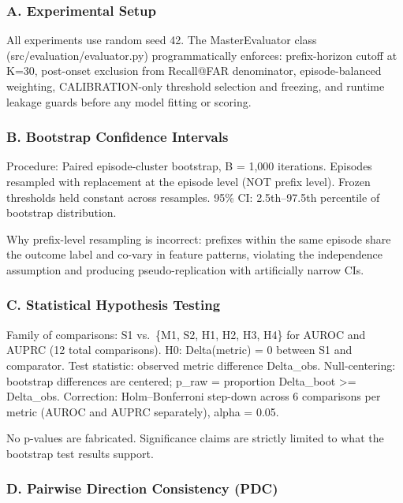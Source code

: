 \documentclass[
]{article}
\begin{document}
\subsubsection{A. Experimental Setup}\label{a.-experimental-setup}

All experiments use random seed 42. The MasterEvaluator class
(src/evaluation/evaluator.py) programmatically enforces: prefix-horizon
cutoff at K=30, post-onset exclusion from Recall@FAR denominator,
episode-balanced weighting, CALIBRATION-only threshold selection and
freezing, and runtime leakage guards before any model fitting or
scoring.

\subsubsection{B. Bootstrap Confidence
Intervals}\label{b.-bootstrap-confidence-intervals}

Procedure: Paired episode-cluster bootstrap, B = 1,000 iterations.
Episodes resampled with replacement at the episode level (NOT prefix
level). Frozen thresholds held constant across resamples. 95\% CI:
2.5th--97.5th percentile of bootstrap distribution.

Why prefix-level resampling is incorrect: prefixes within the same
episode share the outcome label and co-vary in feature patterns,
violating the independence assumption and producing pseudo-replication
with artificially narrow CIs.

\subsubsection{C. Statistical Hypothesis
Testing}\label{c.-statistical-hypothesis-testing}

Family of comparisons: S1 vs.~\{M1, S2, H1, H2, H3, H4\} for AUROC and
AUPRC (12 total comparisons). H0: Delta(metric) = 0 between S1 and
comparator. Test statistic: observed metric difference Delta\_obs.
Null-centering: bootstrap differences are centered; p\_raw = proportion
\textbar Delta\_boot\textbar{} \textgreater=
\textbar Delta\_obs\textbar. Correction: Holm--Bonferroni step-down
across 6 comparisons per metric (AUROC and AUPRC separately), alpha =
0.05.

No p-values are fabricated. Significance claims are strictly limited to
what the bootstrap test results support.

\subsubsection{D. Pairwise Direction Consistency
(PDC)}\label{d.-pairwise-direction-consistency-pdc}
\end{document}
